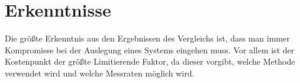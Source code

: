 \section{Erkenntnisse}
Die größte Erkenntnis aus den Ergebnissen des Vergleichs ist, dass man immer Kompromisse bei der Auslegung eines Systems eingehen muss. Vor allem ist der Kostenpunkt der größte Limitierende Faktor, da dieser vorgibt, welche Methode verwendet wird und welche Messraten möglich wird. 
